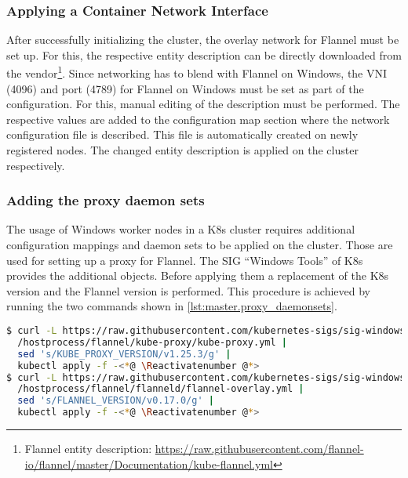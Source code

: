 \subsubsection{Applying a Container Network Interface}
After successfully initializing the cluster, the overlay network for Flannel must be set up.
For this, the respective entity description can be directly downloaded from the vendor\footnote{Flannel entity description: \href{https://raw.githubusercontent.com/flannel-io/flannel/master/Documentation/kube-flannel.yml}{https://raw.githubusercontent.com/flannel-io/flannel/master/Documentation/kube-flannel.yml}}. Since networking has to blend with Flannel on \ac{Windows}, the \ac{VNI} (4096) and port (4789) for Flannel on \ac{Windows} must be set as part of the configuration. For this, manual editing of the description must be performed. The respective values are added to the configuration map section where the network configuration file is described. This file is automatically created on newly registered nodes. The changed entity description is applied on the cluster respectively.



\subsubsection{Adding the proxy daemon sets}
The usage of \ac{Windows} worker nodes in a \ac{K8s} cluster requires additional configuration mappings and daemon sets to be applied on the cluster. Those are used for setting up a proxy for Flannel. The \ac{SIG} \enquote{Windows Tools} of \ac{K8s} provides the additional objects\cite{GitHubKubernetesSIGWindowsTools.20230213}. Before applying them a replacement of the \ac{K8s} version and the Flannel version is performed. This procedure is achieved by running the two commands shown in \autoref{lst:master.proxy_daemonsets}. 
\begin{lstlisting}[label=lst:master.proxy_daemonsets, caption={Bash command for adding the flannel overlay configuration\cite{GitHubKubernetesSIGWindowsTools.20230213}}, language=bash]
$ curl -L https://raw.githubusercontent.com/kubernetes-sigs/sig-windows-tools/master \<*@ \Suppressnumber @*>
  /hostprocess/flannel/kube-proxy/kube-proxy.yml | 
  sed 's/KUBE_PROXY_VERSION/v1.25.3/g' | 
  kubectl apply -f -<*@ \Reactivatenumber @*>
$ curl -L https://raw.githubusercontent.com/kubernetes-sigs/sig-windows-tools/master \<*@ \Suppressnumber @*>
  /hostprocess/flannel/flanneld/flannel-overlay.yml | 
  sed 's/FLANNEL_VERSION/v0.17.0/g' | 
  kubectl apply -f -<*@ \Reactivatenumber @*>
\end{lstlisting}


